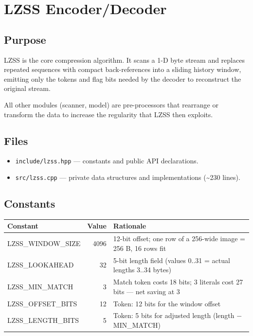 \section{LZSS Encoder/Decoder}

\subsection{Purpose}

LZSS is the core compression algorithm.
It scans a 1-D byte stream and replaces repeated sequences with compact
back-references into a sliding history window, emitting only the tokens and flag
bits needed by the decoder to reconstruct the original stream.

All other modules (scanner, model) are pre-processors that rearrange or transform
the data to increase the regularity that LZSS then exploits.

\subsection{Files}

\begin{itemize}
  \item \texttt{include/lzss.hpp} --- constants and public API declarations.
  \item \texttt{src/lzss.cpp} --- private data structures and implementations
        (\textasciitilde{}230 lines).
\end{itemize}

\subsection{Constants}

\begin{center}
\begin{tabular}{>{\ttfamily}l r l}
\toprule
\textbf{Constant} & \textbf{Value} & \textbf{Rationale} \\
\midrule
LZSS\_WINDOW\_SIZE & 4096 & 12-bit offset; one row of a 256-wide image = 256 B, 16 rows fit \\
LZSS\_LOOKAHEAD    & 32   & 5-bit length field (values 0..31 = actual lengths 3..34 bytes) \\
LZSS\_MIN\_MATCH   & 3    & Match token costs 18 bits; 3 literals cost 27 bits --- net saving at 3 \\
LZSS\_OFFSET\_BITS & 12   & Token: 12 bits for the window offset \\
LZSS\_LENGTH\_BITS & 5    & Token: 5 bits for adjusted length (length $-$ MIN\_MATCH) \\
\bottomrule
\end{tabular}
\end{center}


